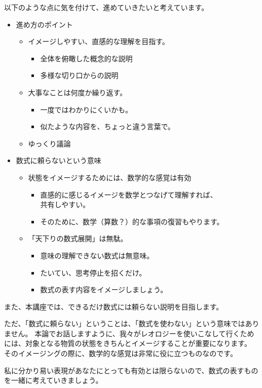 以下のような点に気を付けて、進めていきたいと考えています。
\begin{boxnote}
	\large
	\begin{itemize}
		\item 進め方のポイント
		\begin{itemize}	
			\item
			  イメージしやすい、直感的な理解を目指す。
			  \begin{itemize}
			  \item
				全体を俯瞰した概念的な説明
			  \item
				多様な切り口からの説明
			  \end{itemize}
			\item
			  大事なことは何度か繰り返す。
			  \begin{itemize}
			  \item
				一度ではわかりにくいかも。
			  \item
				似たような内容を、ちょっと違う言葉で。
			  \end{itemize}
			\item
			  ゆっくり議論
		\end{itemize}
		\item 数式に頼らないという意味
		\begin{itemize}
			\item 状態をイメージするためには、数学的な感覚は有効
				\begin{itemize}
					\item 直感的に感じるイメージを数学とつなげて理解すれば、\\
					共有しやすい。
					\item そのために、数学（算数？）的な事項の復習もやります。
				\end{itemize}
			\item 「天下りの数式展開」は無駄。
				\begin{itemize}
				\item 意味の理解できない数式は無意味。
				\item たいてい、思考停止を招くだけ。
				\item 数式の表す内容をイメージしましょう。
				\end{itemize}
		\end{itemize}
	\end{itemize}
\end{boxnote}

また、本講座では、できるだけ数式には頼らない説明を目指します。

ただ、「数式に頼らない」ということは、「数式を使わない」という意味ではありません。
本論でお話しますように、我々がレオロジーを使いこなして行くためには、対象となる物質の状態をきちんとイメージすることが重要になります。
そのイメージングの際に、数学的な感覚は非常に役に立つものなのです。

私に分かり易い表現があなたにとっても有効とは限らないので、数式の表すものを一緒に考えていきましょう。